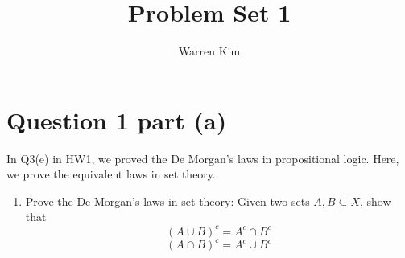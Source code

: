 \documentclass[13pt]{article}
\title{Problem Set 1}
\author{Warren Kim}
\begin{document}
\maketitle

\newpage
\section*{Question 1 part (a)}
In Q3(e) in HW1, we proved the De Morgan’s laws in propositional logic. Here, we prove
the equivalent laws in set theory.
\begin{enumerate}[label=(\alph*)]
\item Prove the De Morgan’s laws in set theory: Given two sets $A, B \subseteq X$, show that
  \[(A \cup B)^c = A^c \cap B^c\]
  \[(A \cap B)^c = A^c \cup B^c\]
\end{enumerate}
\end{document}
